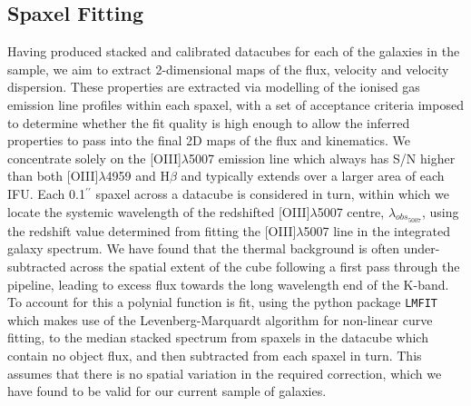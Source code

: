 \documentclass[fleqn,usenatbib]{mn2e}
\begin{document}
\subsection{Spaxel Fitting}
Having produced stacked and calibrated datacubes for each of the galaxies in the sample, we aim to extract 2-dimensional maps of the flux, velocity and velocity dispersion.
These properties are extracted via modelling of the ionised gas emission line profiles within each spaxel, with a set of acceptance criteria imposed to determine whether the fit quality is high enough to allow the inferred properties to pass into the final 2D maps of the flux and kinematics.
We concentrate solely on the [OIII]$\lambda$5007 emission line which always has S/N higher than both [OIII]$\lambda$4959 and H$\beta$ and typically extends over a larger area of each IFU.
Each 0.1$^{\prime\prime}$ spaxel across a datacube is considered in turn, within which we locate the systemic wavelength of the redshifted [OIII]$\lambda$5007 centre, $\lambda_{obs_{5007}}$, using the redshift value determined from fitting the [OIII]$\lambda$5007 line in the integrated galaxy spectrum.
We have found that the thermal background is often under-subtracted across the spatial extent of the cube following a first pass through the pipeline, leading to excess flux towards the long wavelength end of the K-band.
To account for this a polynial function is fit, using the python package {\tt LMFIT} \citep{Newville2014} which makes use of the Levenberg-Marquardt algorithm for non-linear curve fitting, to the median stacked spectrum from spaxels in the datacube which contain no object flux, and then subtracted from each spaxel in turn.
This assumes that there is no spatial variation in the required correction, which we have found to be valid for our current sample of galaxies.
\end{document}
